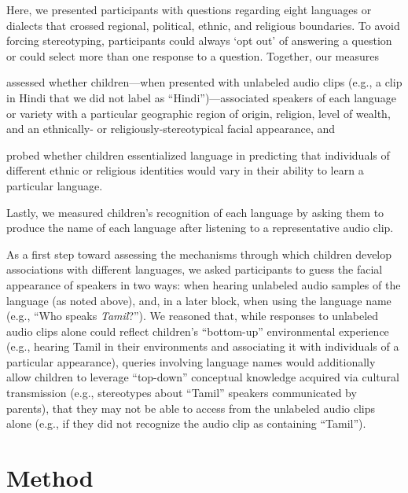 \documentclass{foushee-adapted-preprint}
\begin{document}
Here, we presented participants with questions regarding eight languages or dialects that crossed regional, political, ethnic, and religious boundaries. 
To avoid forcing stereotyping, participants could always `opt out' of answering a question or could select more than one response to a question. Together, our measures 
\begin{inparaenum}[(1)]
    \item assessed whether children---when presented with unlabeled audio clips (e.g., a clip in Hindi that we did not label as ``Hindi'')---associated speakers of each language or variety with a particular geographic region of origin, religion, level of wealth, and an ethnically- or religiously-stereotypical facial appearance, and
    \item probed whether children essentialized language in predicting that individuals of different ethnic or religious identities would vary in their ability to learn a particular language.
\end{inparaenum} 
Lastly, we measured children's recognition of each language by asking them to produce the name of each language after listening to a representative audio clip. %

As a first step toward assessing the mechanisms through which children develop associations with different languages, we asked participants to guess the facial appearance of speakers in two ways: when hearing unlabeled audio samples of the language (as noted above), and, in a later block, when using the language name (e.g., ``Who speaks \textit{Tamil}?''). 
We reasoned that, while responses to unlabeled audio clips alone could reflect children's ``bottom-up'' environmental experience (e.g., hearing Tamil in their environments and associating it with individuals of a particular appearance), queries involving language names would additionally allow children to leverage ``top-down'' conceptual knowledge acquired via cultural transmission (e.g., stereotypes about ``Tamil'' speakers communicated by parents), that they may not be able to access from the unlabeled audio clips alone (e.g., if they did not recognize the audio clip as containing ``Tamil'').

\section{Method}
\end{document}
